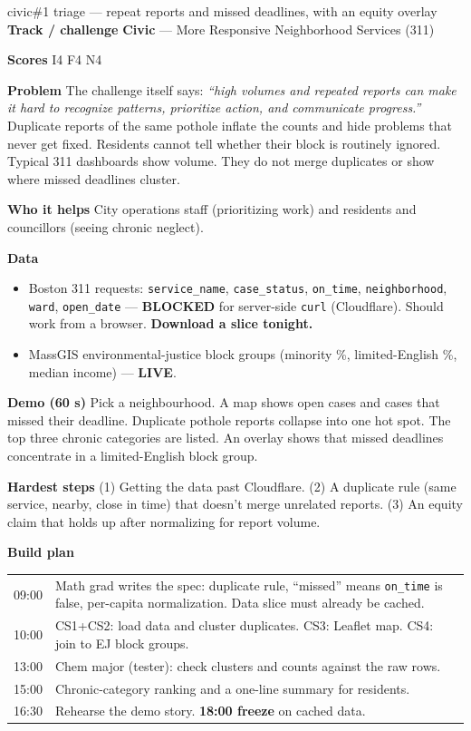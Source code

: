 \documentclass[11pt]{article}
\newcommand{\LIVE}{\textcolor{okgreen}{\textbf{LIVE}}}
\newcommand{\BLOCKED}{\textcolor{warnorange}{\textbf{BLOCKED}}}
\newcommand{\tagC}{\textcolor{civic}{\textbf{Civic}}}
\newcommand{\field}[1]{\textbf{\textsf{#1}}\quad}
\begin{document}
\begin{ideacard}{civic}{\#1  triage --- repeat reports and missed deadlines, with an equity overlay}
\field{Track / challenge} \tagC{} --- More Responsive Neighborhood Services (311)\par
\field{Scores} I4 F4 N4

\field{Problem} The challenge itself says: \emph{``high volumes and repeated reports can make
it hard to recognize patterns, prioritize action, and communicate progress.''} Duplicate
reports of the same pothole inflate the counts and hide problems that never get fixed.
Residents cannot tell whether their block is routinely ignored. Typical 311 dashboards show
volume. They do not merge duplicates or show where missed deadlines cluster.

\field{Who it helps} City operations staff (prioritizing work) and residents and councillors
(seeing chronic neglect).

\field{Data}
\begin{itemize}
\item Boston 311 requests: \texttt{service\_name}, \texttt{case\_status}, \texttt{on\_time},
  \texttt{neighborhood}, \texttt{ward}, \texttt{open\_date} --- \BLOCKED{} for server-side
  \texttt{curl} (Cloudflare). Should work from a browser. \textbf{Download a slice tonight.}
\item MassGIS environmental-justice block groups (minority \%, limited-English \%, median
  income) --- \LIVE.
\end{itemize}

\field{Demo (60 s)} Pick a neighbourhood. A map shows open cases and cases that missed their
deadline. Duplicate pothole reports collapse into one hot spot. The top three chronic
categories are listed. An overlay shows that missed deadlines concentrate in a
limited-English block group.

\field{Hardest steps} (1) Getting the data past Cloudflare. (2) A duplicate rule (same
service, nearby, close in time) that doesn't merge unrelated reports. (3) An equity claim that
holds up after normalizing for report volume.

\field{Build plan}\par\nopagebreak
\begin{tabularx}{\linewidth}{@{}L{1.2cm} X@{}}
09:00 & Math grad writes the spec: duplicate rule, ``missed'' means \texttt{on\_time} is false, per-capita normalization. Data slice must already be cached.\\
10:00 & CS1+CS2: load data and cluster duplicates. CS3: Leaflet map. CS4: join to EJ block groups.\\
13:00 & Chem major (tester): check clusters and counts against the raw rows.\\
15:00 & Chronic-category ranking and a one-line summary for residents.\\
16:30 & Rehearse the demo story. \textbf{18:00 freeze} on cached data.\\
\end{tabularx}


\end{ideacard}
\end{document}
